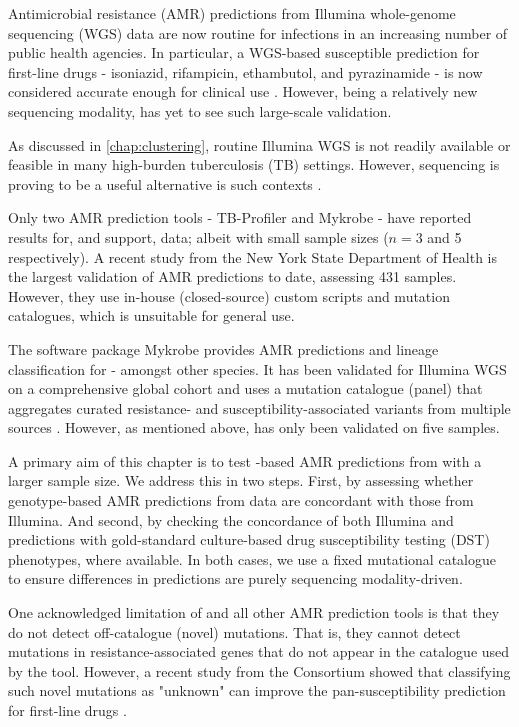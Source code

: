 Antimicrobial resistance (AMR) predictions from Illumina whole-genome sequencing (WGS) data are now routine for \mtb{} infections in an increasing number of public health agencies. In particular, a WGS-based susceptible prediction for first-line drugs - isoniazid, rifampicin, ethambutol, and pyrazinamide - is now considered accurate enough for clinical use \cite{cryptic2018}. However, being a relatively new sequencing modality, \ont{} has yet to see such large-scale validation.

As discussed in \autoref{chap:clustering}, routine Illumina WGS is not readily available or feasible in many high-burden tuberculosis (TB) settings. However, \ont{} sequencing is proving to be a useful alternative is such contexts \cite{Inzaule2021,faria2016,quick2016,who-ngs2018}. 

Only two \mtb{} AMR prediction tools - TB-Profiler \cite{phelan2019} and Mykrobe \cite{hunt2019} - have reported results for, and support, \ont{} data; albeit with small sample sizes ($n=3$ and 5 respectively). A recent study from the New York State Department of Health is the largest validation of \ont{} AMR predictions to date, assessing 431 samples. However, they use in-house (closed-source) custom scripts and mutation catalogues, which is unsuitable for general use. 

The software package Mykrobe provides AMR predictions and lineage classification for \mtb{} - amongst other species. It has been validated for Illumina WGS on a comprehensive global cohort and uses a mutation catalogue (panel) that aggregates curated resistance- and susceptibility-associated variants from multiple sources \cite{hunt2019}. However, as mentioned above, \mykrobe{} has only been validated on five \ont{} samples.

A primary aim of this chapter is to test \ont{}-based AMR predictions from \mykrobe{} with a larger sample size. We address this in two steps. First, by assessing whether genotype-based AMR predictions from \ont{} data are concordant with those from Illumina. And second, by checking the concordance of both Illumina and \ont{} predictions with gold-standard culture-based drug susceptibility testing (DST) phenotypes, where available. In both cases, we use a fixed mutational catalogue to ensure differences in predictions are purely sequencing modality-driven.

One acknowledged limitation of \mykrobe{} and all other \mtb{} AMR prediction tools is that they do not detect off-catalogue (novel) mutations. That is, they cannot detect mutations in resistance-associated genes that do not appear in the catalogue used by the tool. However, a recent study from the \cryptic{} Consortium showed that classifying such novel mutations as "unknown" can improve the pan-susceptibility prediction for first-line drugs \cite{cryptic2018}. 

